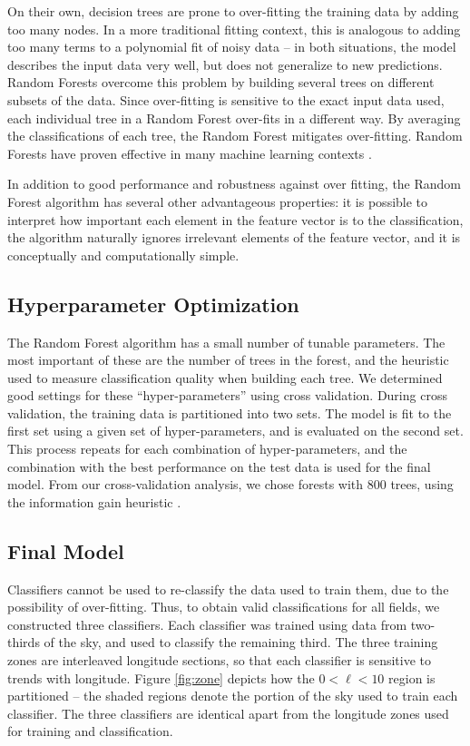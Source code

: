 \documentclass[preprint]{aastex}
\begin{document}
On their own, decision trees are prone to over-fitting the training data by adding too many nodes. In a more traditional fitting context, this is analogous to adding too many terms to a polynomial fit of noisy data -- in both situations, the model describes the input data very well, but does not generalize to new predictions. Random Forests overcome this problem by building several trees on different subsets of the data. Since over-fitting is sensitive to the exact input data used, each individual tree in a Random Forest over-fits in a different way. By averaging the classifications of each tree, the Random Forest mitigates over-fitting. Random Forests have proven effective in many machine learning contexts \citep{Kuhn13}.

In addition to good performance and robustness against over fitting, the Random Forest algorithm has several other advantageous properties: it is possible to interpret how important each element in the feature vector is to the classification, the algorithm naturally ignores irrelevant elements of the feature vector, and it is conceptually and computationally simple.

\subsection{Hyperparameter Optimization}
The Random Forest algorithm has a small number of tunable parameters. The most important of these are the number of trees in the forest, and the heuristic used to measure classification quality when building each tree. We determined good settings for these ``hyper-parameters'' using cross validation. During cross validation, the training data is partitioned into two sets. The model is fit to the first set using a given set of hyper-parameters, and is evaluated on the second set. This process repeats for each combination of hyper-parameters, and the combination with the best performance on the test data is used for the final model. From our cross-validation analysis, we chose forests with 800 trees, using the information gain heuristic \citep{Raileanu04}.

\subsection{Final Model}

Classifiers cannot be used to re-classify the data used to train them, due to the possibility of over-fitting. Thus, to obtain valid classifications for all fields, we constructed three classifiers. Each classifier was trained using data from two-thirds of the sky, and used to classify the remaining third. The three training zones are interleaved longitude sections, so that each classifier is sensitive to trends with longitude. Figure \ref{fig:zone} depicts how the $0 < \ell < 10$ region is partitioned -- the shaded regions denote the portion of the sky used to train each classifier. The three classifiers are identical apart from the longitude zones used for training and classification.
\end{document}
